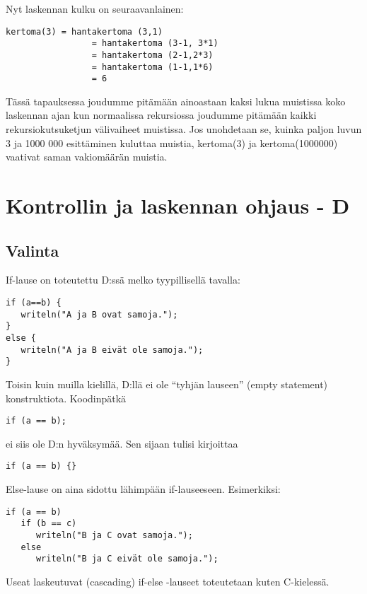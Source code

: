 \documentclass[11pt,oneside,a4paper]{article}
\begin{document}
Nyt laskennan kulku on seuraavanlainen: 
\begin{verbatim}
kertoma(3) = hantakertoma (3,1)
                 = hantakertoma (3-1, 3*1)		
                 = hantakertoma (2-1,2*3)
                 = hantakertoma (1-1,1*6)
                 = 6
\end{verbatim}
Tässä tapauksessa joudumme pitämään ainoastaan kaksi lukua muistissa koko
laskennan ajan kun normaalissa rekursiossa joudumme pitämään kaikki
rekursiokutsuketjun välivaiheet muistissa. Jos unohdetaan se, kuinka paljon
luvun 3 ja 1000 000 esittäminen kuluttaa muistia, kertoma(3) ja kertoma(1000000)
vaativat saman vakiomäärän muistia. 

\section{Kontrollin ja laskennan ohjaus - D}

\subsection{Valinta}

If-lause on toteutettu D:ssä melko tyypillisellä tavalla:

\begin{verbatim}
if (a==b) {
   writeln("A ja B ovat samoja.");
}
else {
   writeln("A ja B eivät ole samoja.");
}
\end{verbatim}

Toisin kuin muilla kielillä, D:llä ei ole ``tyhjän lauseen'' (empty statement)
konstruktiota. Koodinpätkä

\begin{verbatim}
if (a == b);
\end{verbatim}

ei siis ole D:n hyväksymää. Sen sijaan tulisi kirjoittaa

\begin{verbatim}
if (a == b) {}
\end{verbatim}

Else-lause on aina sidottu lähimpään if-lauseeseen. Esimerkiksi:

\begin{verbatim}
if (a == b)
   if (b == c)
      writeln("B ja C ovat samoja.");
   else
      writeln("B ja C eivät ole samoja.");
\end{verbatim}

Useat laskeutuvat (cascading) if-else -lauseet toteutetaan kuten C-kielessä.
\end{document}
